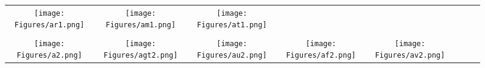 \documentclass[journal]{IEEEtran}
\begin{document}
\begin{figure*}[!t]
\begin{tabular}{cccccccc}
		\hspace{0.4cm}
		\begin{minipage}{30pt}
			\texttt{[image: Figures/ar1.png]}
\end{minipage}
		&
		\hspace{0.4cm}
		\begin{minipage}{30pt}
			\texttt{[image: Figures/am1.png]}
\end{minipage}
		&
		\hspace{0.4cm}
		\begin{minipage}{30pt}
			\texttt{[image: Figures/at1.png]}
\end{minipage}
		\\
		\\
		\begin{minipage}{30pt}
			\texttt{[image: Figures/a2.png]}
\end{minipage}
		&
		\hspace{0.4cm}
		\begin{minipage}{30pt}
			\texttt{[image: Figures/agt2.png]}
\end{minipage}
		&
		\hspace{0.4cm}
		\begin{minipage}{30pt}
			\texttt{[image: Figures/au2.png]}
\end{minipage}
		&
		\hspace{0.4cm}
		\begin{minipage}{30pt}
			\texttt{[image: Figures/af2.png]}
\end{minipage}
		&
		\hspace{0.4cm}
		\begin{minipage}{30pt}
			\texttt{[image: Figures/av2.png]}
\end{minipage}
		

\end{tabular}
\end{figure*}
\end{document}

